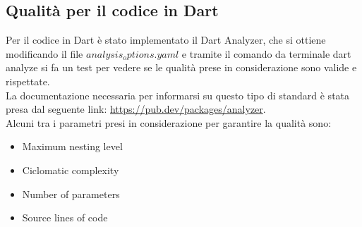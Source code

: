 \documentclass{article}
\begin{document}
\subsection{Qualità per il codice in Dart}
Per il codice in Dart è stato implementato il Dart Analyzer, che si ottiene modificando il file
$analysis_options.yaml$ e tramite il comando da terminale dart analyze si fa un test per 
vedere se le qualità prese in considerazione sono valide e rispettate.
\\La documentazione necessaria per informarsi su questo tipo di standard è stata presa
dal seguente link: \url{https://pub.dev/packages/analyzer}.
\\Alcuni tra i parametri presi in considerazione per garantire la qualità sono:

\begin{itemize}
    \item Maximum nesting level
    \item Ciclomatic complexity
    \item Number of parameters
    \item Source lines of code
\end{itemize}
\end{document}
